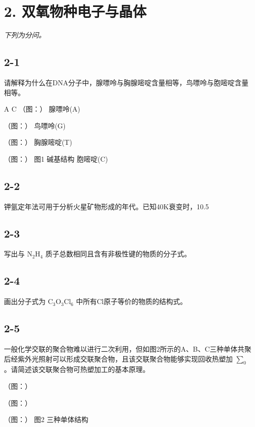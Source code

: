 \section*{2. 双氧物种电子与晶体}
\textit{下列为分问。}

\subsection*{2-1}
请解释为什么在DNA分⼦中，腺嘌呤与胸腺嘧啶含量相等，⻦嘌呤与胞嘧啶含量相等。

A
C
（图：）
腺嘌呤(A)

（图：）
⻦嘌呤(G)

（图：）
胸腺嘧啶(T)

（图：）
图1 碱基结构
胞嘧啶(C)

\subsection*{2-2}
钾氩定年法可⽤于分析⽕星矿物形成的年代。已知40K衰变时，10.5%

\subsection*{2-3}
写出与 $\mathrm { N _ { 2 } H _ { 4 } }$ 质⼦总数相同且含有⾮极性键的物质的分⼦式。

\subsection*{2-4}
画出分⼦式为 $\mathrm { C _ { 3 } O _ { 3 } C l _ { 6 } }$ 中所有Cl原⼦等价的物质的结构式。

\subsection*{2-5}
⼀般化学交联的聚合物难以进⾏⼆次利⽤，但如图2所⽰的A、B、C三种单体共聚后经紫外光照射可以形成交联聚合物，且该交联聚合物能够实现回收热塑加 $\scriptstyle \sum _ { 0 }$ 。请简述该交联聚合物可热塑加⼯的基本原理。

（图：）

（图：）

（图：）
图2 三种单体结构
